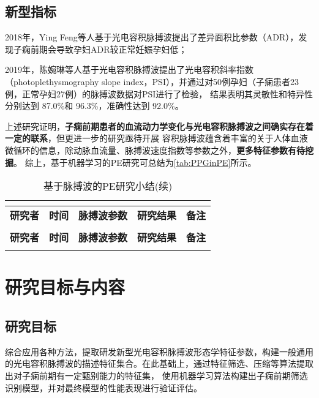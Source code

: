 \subsection{新型指标}
2018年，Ying Feng等人\cite{Feng2018}基于光电容积脉搏波提出了差异面积比参数（ADR），发现子痫前期会导致孕妇ADR较正常妊娠孕妇低；

2019年，陈婉琳等人\cite{Chen2019}基于光电容积脉搏波提出了光电容积斜率指数（photoplethysmography slope index，PSI），并通过对50例孕妇（子痫患者23例，正常孕妇27例）的脉搏波数据对PSI进行了检验，
结果表明其灵敏性和特异性分别达到 87.0\%和 96.3\%，准确性达到 92.0\%。

上述研究证明，\textbf{子痫前期患者的血流动力学变化与光电容积脉搏波之间确实存在着一定的联系}，但更进一步的研究亟待开展
容积脉搏波蕴含着丰富的关于人体血液微循环的信息，除动脉血流量、脉搏波速度指数等参数之外，\textbf{更多特征参数有待挖掘}。
综上，基于机器学习的PE研究可总结为\autoref{tab:PPGinPE}所示。

\begin{center}
    \fontsize{10}{4}
	\begin{longtable}{p{3cm}<{\centering}p{1cm}<{\centering}p{2cm}<{\centering}p{6cm}<{\centering}p{1cm}<{\centering}}
		\caption{基于脉搏波的PE研究小结}\\
		\label{tab:PPGinPE}\\
		\hline
            \textbf{研究者}&\textbf{时间}&\textbf{脉搏波参数}&\textbf{研究结果}&\textbf{备注}\\
        \hline
        \endfirsthead
        \caption{基于脉搏波的PE研究小结(续)}\\
        \hline
            \textbf{研究者}&\textbf{时间}&\textbf{脉搏波参数}&\textbf{研究结果}&\textbf{备注}\\
        \hline
        \endhead 
        \hline
        \endfoot
	\end{longtable}
\end{center}

\section{研究目标与内容}

\subsection{研究目标}
综合应用各种方法，提取研发新型光电容积脉搏波形态学特征参数，构建一般通用的光电容积脉搏波的描述特征集合。在此基础上，通过特征筛选、压缩等算法提取出对子痫前期有一定甄别能力的特征集，
使用机器学习算法构建出子痫前期筛选识别模型，并对最终模型的性能表现进行验证评估。
